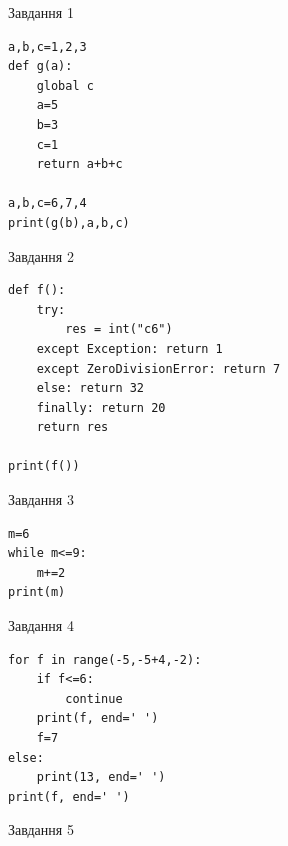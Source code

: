 \documentclass[12pt, ukrainian]{article}
\begin{document}
{{{{{{{{{{{{{{{{{\begin{minipage}[t]{8.5cm}
{\begin{center}Завдання {1}\end{center}}
\vspace{-6mm}

\begin{verbatim}
a,b,c=1,2,3
def g(a):
    global c
    a=5
    b=3
    c=1
    return a+b+c

a,b,c=6,7,4
print(g(b),a,b,c)
\end{verbatim}


\vspace{5mm}
               
{\begin{center}Завдання {2}\end{center}}
\vspace{-6mm}

\begin{verbatim}
def f():
    try:
        res = int("c6")
    except Exception: return 1
    except ZeroDivisionError: return 7
    else: return 32
    finally: return 20
    return res

print(f())
\end{verbatim}


\vspace{5mm}
               
{\begin{center}Завдання {3}\end{center}}
\vspace{-6mm}

\begin{verbatim}
m=6
while m<=9:
    m+=2
print(m)
\end{verbatim}


\end{minipage}
\vline \hspace{6mm}
\begin{minipage}[t]{10.7cm}
               
{\begin{center}Завдання {4}\end{center}}
\vspace{-6mm}

\begin{verbatim}
for f in range(-5,-5+4,-2):
    if f<=6:
        continue
    print(f, end=' ')
    f=7
else:
    print(13, end=' ')
print(f, end=' ')
\end{verbatim}


\vspace{5mm}
               
{\begin{center}Завдання {5}\end{center}}
\vspace{-6mm}


\end{minipage}}}}}}}}}}}}}}}}}}
\end{document}
